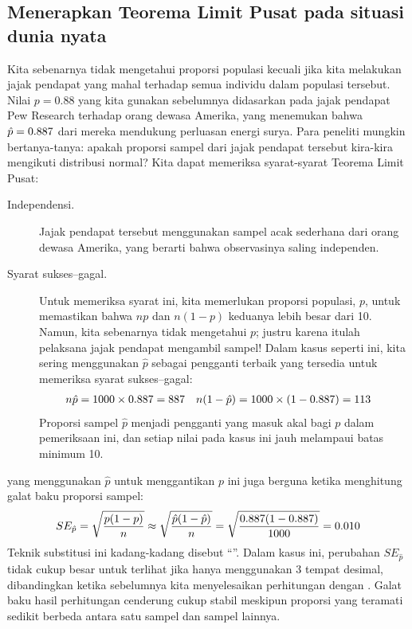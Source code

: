 \subsection{Menerapkan Teorema Limit Pusat pada
    situasi dunia nyata}
\label{apply_clt_real_world_setting}

Kita sebenarnya tidak mengetahui proporsi populasi
kecuali jika kita melakukan jajak pendapat yang mahal terhadap semua individu
dalam populasi tersebut.
Nilai $p = 0.88$ yang kita gunakan sebelumnya didasarkan pada jajak pendapat
Pew Research terhadap \pewsolarpollsize{}
orang dewasa Amerika, yang menemukan bahwa
$\hat{p} = 0.887{}$ dari mereka mendukung
perluasan energi surya.
Para peneliti mungkin bertanya-tanya:
apakah proporsi sampel dari jajak pendapat tersebut kira-kira
mengikuti distribusi normal?
Kita dapat memeriksa syarat-syarat Teorema Limit Pusat:
\begin{description}
\item[Independensi.] Jajak pendapat tersebut menggunakan sampel acak sederhana dari
    orang dewasa Amerika, yang berarti bahwa observasinya saling
    independen.
\item[Syarat sukses--gagal.] Untuk memeriksa syarat ini,
    kita memerlukan proporsi populasi, $p$, untuk memastikan bahwa
    $np$ dan $n(1-p)$ keduanya lebih besar dari 10.
    Namun, kita sebenarnya tidak mengetahui $p$; justru
    karena itulah pelaksana jajak pendapat mengambil sampel!
    Dalam kasus seperti ini, kita sering menggunakan $\hat{p}$
    sebagai pengganti terbaik yang tersedia untuk memeriksa syarat sukses--gagal:
    \begin{align*}
    n\hat{p}
        &= 1000{} \times 0.887{}
        = 887{}
    &n (1 - \hat{p})
        &= 1000{} \times (1 - 0.887{})
        = 113{}
    \end{align*}
    Proporsi sampel $\hat{p}$ menjadi
    pengganti yang masuk akal bagi $p$ dalam pemeriksaan ini,
    dan setiap nilai pada kasus ini jauh melampaui batas minimum 10.
\end{description}

 yang menggunakan $\hat{p}$ untuk
menggantikan $p$ ini juga berguna ketika menghitung galat baku
proporsi sampel:
\begin{align*}
SE_{\hat{p}}
    = \sqrt{\frac{p (1 - p)}{n}}
    \approx \sqrt{\frac{\hat{p} (1 - \hat{p})}{n}}
    = \sqrt{\frac{0.887{}
        (1 - 0.887{})}{1000{}}}
    = 0.010{}
\end{align*}
Teknik substitusi ini kadang-kadang
disebut ``''.
Dalam kasus ini, perubahan $SE_{\hat{p}}$ tidak cukup besar untuk
terlihat jika hanya menggunakan 3 tempat desimal,
dibandingkan ketika sebelumnya kita menyelesaikan perhitungan dengan
\pewsolarparprop{}.
Galat baku hasil perhitungan cenderung cukup stabil
meskipun proporsi yang teramati sedikit berbeda antara satu
sampel dan sampel lainnya.


